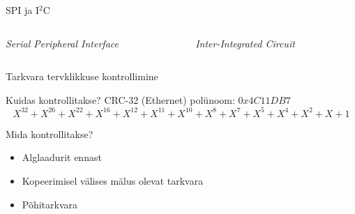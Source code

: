 \documentclass[pdf]{beamer}
\begin{document}
\begin{frame}{SPI ja I\({}^2\)C}
	\begin{columns}
		\begin{column}{0.46\textwidth}
			\begin{block}{\textit{Serial Peripheral Interface}}
			\end{block}
		\end{column}
		\begin{column}{0.46\textwidth}
			\begin{block}{\textit{Inter-Integrated Circuit}}
			\end{block}
		\end{column}
	\end{columns}
\end{frame}

\begin{frame}{Tarkvara tervklikkuse kontrollimine}
	\begin{block}{Kuidas kontrollitakse?}
		CRC-32 (Ethernet) polünoom: \( 0x4C11DB7\)
		\[ X^{32} + X^{26} + X^{22} + X^{16} + X^{12}
			+ X^{11} + X^{10} + X^8 + X^7 + X^5 + X^4
		+ X^2 + X + 1\]
	\end{block}
	\begin{block}{Mida kontrollitakse?}
		\begin{itemize}
			\item Alglaadurit ennast
			\item Kopeerimisel välises mälus olevat tarkvara
			\item Põhitarkvara
		\end{itemize}
	\end{block}
\end{frame}
\end{document}
